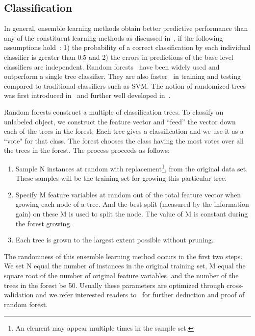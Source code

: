 \subsection{Classification}
In general, ensemble learning methods obtain better predictive performance than
 any of the constituent learning methods as discussed in~\cite{ensem1,ensem2}, if the following assumptions hold~\cite{ensem3}: 1) the 
 probability of a correct classification by each individual classifier is greater than 0.5 and 2) the errors
  in predictions of the base-level classifiers are independent. Random forests~\cite{RF} have been widely used 
  and outperform a single tree classifier. They are also faster~\cite{cvpr} in training and testing compared to traditional classifiers such as SVM. The notion of randomized trees was first introduced in~\cite{RT} and further well developed in~\cite{RF}.

Random forests construct a multiple of classification trees. To classify an unlabeled object, we construct the feature vector and 
``feed'' the vector down each of the trees in the forest. Each tree gives a classification and we use it as a 
``vote" for that class. The forest chooses the class having the most votes over all the trees in the forest. 
The process proceeds as follows:
\begin{enumerate}
\item Sample N instances at random with replacement\footnote{An element may appear multiple times in the sample set.}, from the original data set. These samples will be the training set for growing this particular tree.
\item Specify M feature variables at random out of the total feature vector when growing each node of a tree. And the best split (measured by the information gain) on these M is used to split the node. The value of M is constant during the forest growing.
\item Each tree is grown to the largest extent possible without pruning.
\end{enumerate}
The randomness of this ensemble learning method occurs in the first two steps.  We set N equal the number of instances in the original training set, M equal the square root of the
number of original feature variables, and the number of the trees in the forest be 50. Usually these parameters are optimized
through cross-validation and we refer interested readers to~\cite{RF} for further deduction and proof of random forest.

